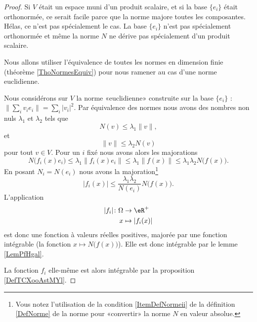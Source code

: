 \begin{proof}
    Si \( V\) était un espace muni d'un produit scalaire, et si la base \( \{ e_i \}\) était orthonormée, ce serait facile parce que la norme majore toutes les composantes. Hélas, ce n'est pas spécialement le cas. La base \( \{ e_i \}\) n'est pas spécialement orthonormée et même la norme \( N\) ne dérive pas spécialement d'un produit scalaire.

    Nous allons utiliser l'équivalence de toutes les normes en dimension finie (théorème \ref{ThoNormesEquiv}) pour nous ramener au cas d'une norme euclidienne.

    Nous considérons sur \( V\) la norme «euclidienne» construite sur la base \( \{ e_i \}\) : \( \| \sum_iv_ie_i \|=\sum_i| v_i |^2\). Par équivalence des normes nous avons des nombres non nuls \( \lambda_1\) et \( \lambda_2\) tels que
    \begin{equation}
        N(v)\leq \lambda_1\| v \|,
    \end{equation}
    et
    \begin{equation}
        \| v \|\leq \lambda_2 N(v)
    \end{equation}
    pour tout \( v\in V\). Pour un \( i\) fixé nous avons alors les majorations
    \begin{equation}
        N\big( f_i(x)e_i \big)\leq \lambda_1\| f_i(x)e_i \|\leq \lambda_1\| f(x) \|\leq \lambda_1\lambda_2N\big( f(x) \big).
    \end{equation}
    En posant \( N_i=N(e_i)\) nous avons la majoration\footnote{Vous notez l'utilisation de la condition \ref{ItemDefNormeii} de la définition \ref{DefNorme} de la norme pour «convertir» la norme \( N\) en valeur absolue.}
    \begin{equation}
        | f_i(x) |\leq \frac{ \lambda_1\lambda_2 }{ N(e_i) }N\big( f(x) \big).
    \end{equation}
    L'application 
    \begin{equation}
        \begin{aligned}
            | f_i |\colon \Omega&\to \eR^+ \\
            x&\mapsto | f_i(x) | 
        \end{aligned}
    \end{equation}
    est donc une fonction à valeurs réelles positives, majorée par une fonction intégrable (la fonction \( x\mapsto N\big( f(x) \big)\)). Elle est donc intégrable par le lemme \ref{LemPfHgal}.

    La fonction \( f_i\) elle-même est alors intégrable par la proposition \ref{DefTCXooAstMYl}.
\end{proof}

